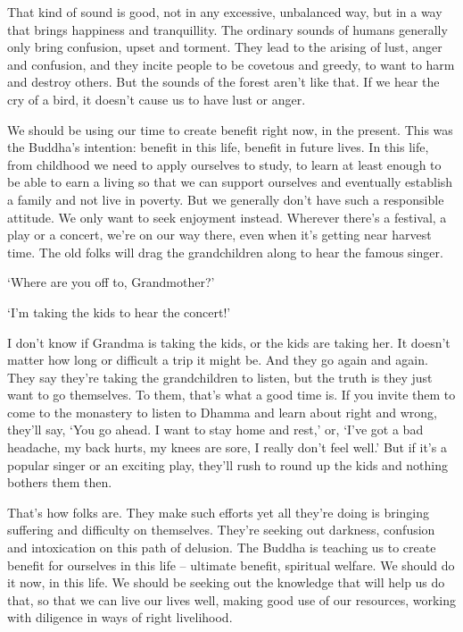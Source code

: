 That kind of sound is good, not in any excessive, unbalanced way, but in a way that brings happiness and tranquillity. The ordinary sounds of humans generally only bring confusion, upset and torment. They lead to the arising of lust, anger and confusion, and they incite people to be covetous and greedy, to want to harm and destroy others. But the sounds of the forest aren't like that. If we hear the cry of a bird, it doesn't cause us to have lust or anger.

We should be using our time to create benefit right now, in the present. This was the Buddha's intention: benefit in this life, benefit in future lives. In this life, from childhood we need to apply ourselves to study, to learn at least enough to be able to earn a living so that we can support ourselves and eventually establish a family and not live in poverty. But we generally don't have such a responsible attitude. We only want to seek enjoyment instead. Wherever there's a festival, a play or a concert, we're on our way there, even when it's getting near harvest time. The old folks will drag the grandchildren along to hear the famous singer.

`Where are you off to, Grandmother?'

`I'm taking the kids to hear the concert!'

I don't know if Grandma is taking the kids, or the kids are taking her. It doesn't matter how long or difficult a trip it might be. And they go again and again. They say they're taking the grandchildren to listen, but the truth is they just want to go themselves. To them, that's what a good time is. If you invite them to come to the monastery to listen to Dhamma and learn about right and wrong, they'll say, `You go ahead. I want to stay home and rest,' or, `I've got a bad headache, my back hurts, my knees are sore, I really don't feel well.' But if it's a popular singer or an exciting play, they'll rush to round up the kids and nothing bothers them then.

That's how folks are. They make such efforts yet all they're doing is bringing suffering and difficulty on themselves. They're seeking out darkness, confusion and intoxication on this path of delusion. The Buddha is teaching us to create benefit for ourselves in this life -- ultimate benefit, spiritual welfare. We should do it now, in this life. We should be seeking out the knowledge that will help us do that, so that we can live our lives well, making good use of our resources, working with diligence in ways of right livelihood.

